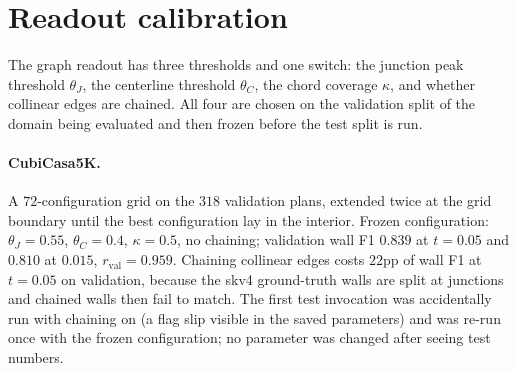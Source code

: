 \documentclass{article}
\begin{document}
\section{Readout calibration}\label{app:readout}
The graph readout has three thresholds and one switch: the junction peak
threshold $\theta_J$, the centerline threshold $\theta_C$, the chord coverage
$\kappa$, and whether collinear edges are chained. All four are chosen on the
validation split of the domain being evaluated and then frozen before the
test split is run.

\paragraph{CubiCasa5K.} A $72$-configuration grid on the $318$ validation
plans, extended twice at the grid boundary until the best configuration lay in
the interior. Frozen configuration: $\theta_J=0.55$, $\theta_C=0.4$,
$\kappa=0.5$, no chaining; validation wall F1 $0.839$ at $t=0.05$ and
$0.810$ at $0.015$, $r_{\mathrm{val}}=0.959$. Chaining collinear edges costs
$22$pp of wall F1 at $t=0.05$ on validation, because the skv4 ground-truth
walls are split at junctions and chained walls then fail to match. The first
test invocation was accidentally run with chaining on (a flag slip visible in
the saved parameters) and was re-run once with the frozen configuration; no
parameter was changed after seeing test numbers.
\end{document}
